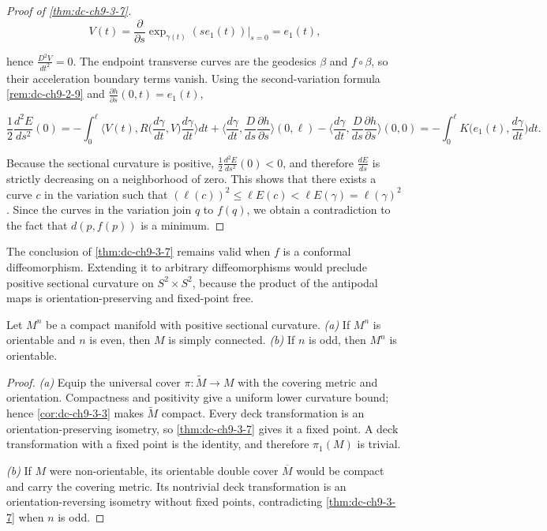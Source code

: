 \begin{proof}[Proof of \cref{thm:dc-ch9-3-7}]
  $$
  V(t)=\frac{\partial}{\partial s}\exp_{\gamma(t)}(se_1(t))\Big|_{s=0}=e_1(t),
  $$

  hence $\frac{D^2 V}{dt^2}=0$. The endpoint transverse curves are the
  geodesics $\beta$ and $f\circ\beta$, so their acceleration boundary terms vanish.
  Using the second-variation formula \cref{rem:dc-ch9-2-9} and
  $\frac{\partial h}{\partial s}(0,t)=e_1(t)$,

  $$
  \frac{1}{2}\frac{d^2 E}{ds^2}(0)=-\int_0^\ell\Big\langle V(t),R\Big(\frac{d\gamma}{dt},V\Big)\frac{d\gamma}{dt}\Big\rangle dt+\Big\langle\frac{d\gamma}{dt},\frac{D}{ds}\frac{\partial h}{\partial s}\Big\rangle(0,\ell)-\Big\langle\frac{d\gamma}{dt},\frac{D}{ds}\frac{\partial h}{\partial s}\Big\rangle(0,0)=-\int_0^\ell K\Big(e_1(t),\frac{d\gamma}{dt}\Big)dt.
  $$

  Because the sectional curvature is positive, $\frac{1}{2}\frac{d^2 E}{ds^2}(0)<0$,
  and therefore $\frac{dE}{ds}$ is strictly decreasing on a neighborhood of zero.
  This shows that there exists a curve $c$ in the variation such that
  $(\ell(c))^2\le\ell E(c)<\ell E(\gamma)=\ell(\gamma)^2$. Since the curves in the
  variation join $q$ to $f(q)$, we obtain a contradiction to the fact that
  $d(p,f(p))$ is a minimum.
\end{proof}
\begin{remark}
  \label{rem:dc-ch9-3-9}
  The conclusion of \cref{thm:dc-ch9-3-7} remains valid when $f$ is a
  conformal diffeomorphism. Extending it to arbitrary diffeomorphisms would
  preclude positive sectional curvature on $S^2\times S^2$, because the
  product of the antipodal maps is orientation-preserving and fixed-point free.
\end{remark}
\begin{corollary}[Synge]
  \label{cor:dc-ch9-3-10}
  Let $M^n$ be a compact manifold with positive sectional curvature.
  \emph{(a)} If $M^n$ is orientable and $n$ is even, then $M$ is simply connected.
  \emph{(b)} If $n$ is odd, then $M^n$ is orientable.
\end{corollary}
\begin{proof}
  \sketch
  \emph{(a)} Equip the universal cover $\pi:\tilde M\to M$ with the
  covering metric and orientation. Compactness and positivity give a uniform
  lower curvature bound; hence \cref{cor:dc-ch9-3-3} makes $\tilde M$
  compact. Every deck transformation is an orientation-preserving isometry, so
  \cref{thm:dc-ch9-3-7} gives it a fixed point. A deck transformation with a
  fixed point is the identity, and therefore $\pi_1(M)$ is trivial.

  \emph{(b)} If $M$ were non-orientable, its orientable double cover
  $\overline M$ would be compact and carry the covering metric. Its nontrivial
  deck transformation is an orientation-reversing isometry without fixed
  points, contradicting \cref{thm:dc-ch9-3-7} when $n$ is odd.
\end{proof}
